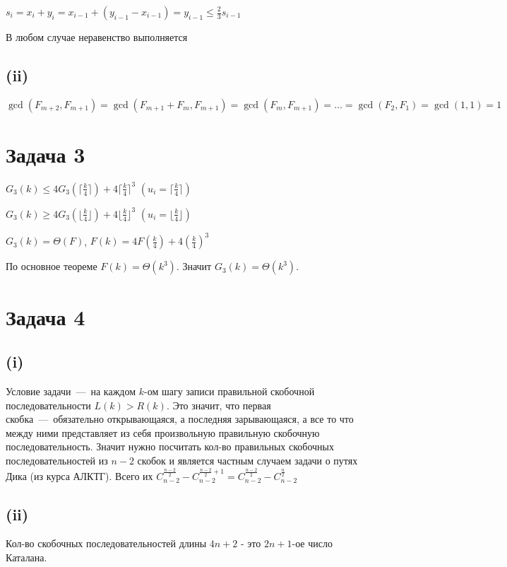 \documentclass[a4paper,12pt]{article} %
\begin{document}
$s_i=x_{i}+y_{i}=x_{i-1}+(y_{i-1}-x_{i-1})=y_{i-1}\leq \frac{2}{3}s_{i-1}$

В любом случае неравенство выполняется

\subsection{(ii)}
\hspace{5mm}
$\gcd(F_{m+2},F_{m+1})=\gcd(F_{m+1}+F_{m},F_{m+1})=\gcd(F_{m},F_{m+1})=\ldots =\gcd(F_2,F_1)=\gcd(1,1)=1$

\section{Задача 3}
\hspace{5mm}
$G_3(k)\leq 4G_3(\lceil{\frac{k}{4}}\rceil)+4\lceil{\frac{k}{4}}\rceil^3 $ $(u_i=\lceil{\frac{k}{4}}\rceil)$

$G_3(k)\geq 4G_3(\lfloor{\frac{k}{4}}\rfloor)+4\lfloor{\frac{k}{4}}\rfloor^3 $ $(u_i=\lfloor{\frac{k}{4}}\rfloor)$

$G_3(k)=\Theta(F)$, $F(k)=4F(\frac{k}{4})+4(\frac{k}{4})^3$

По основное теореме $F(k)=\Theta(k^3)$. Значит $G_3(k)=\Theta(k^3)$.

\section{Задача 4}
\subsection{(i)}
\hspace{5mm}
Условие задачи~---~на каждом $k$-ом шагу записи правильной скобочной последовательности $L(k)>R(k)$. Это значит, что первая скобка~---~обязательно открывающаяся, а последняя зарывающаяся, а все то что между ними представляет из себя произвольную правильную скобочную последовательность. Значит нужно посчитать кол-во правильных скобочных последовательностей из $n-2$ скобок и является частным случаем задачи о путях Дика (из курса АЛКТГ). Всего их $C_{n-2}^{\frac{n-2}{2}}-C_{n-2}^{\frac{n-2}{2}+1}=C_{n-2}^{\frac{n-2}{2}}-C_{n-2}^{\frac{n}{2}}$

\subsection{(ii)}
\hspace{5mm}
Кол-во скобочных последовательностей длины $4n+2$ - это $2n+1$-ое число Каталана. 
\end{document}
